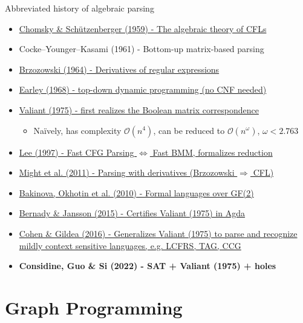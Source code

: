 \documentclass{beamer}
\begin{document}
\begin{frame}{Abbreviated history of algebraic parsing}
  \begin{itemize}
    \item \href{http://www-igm.univ-mlv.fr/~berstel/Mps/Travaux/A/1963-7ChomskyAlgebraic.pdf}{Chomsky \& Sch\"utzenberger (1959) - The algebraic theory of CFLs}
    \item Cocke–Younger–Kasami (1961) - Bottom-up matrix-based parsing
    \item \href{https://dl.acm.org/doi/10.1145/321239.321249}{Brzozowski (1964) - Derivatives of regular expressions}
    \item \href{https://dl.acm.org/doi/10.1145/362007.362035}{Earley (1968) - top-down dynamic programming (no CNF needed)}
    \item \href{http://theory.stanford.edu/~virgi/cs367/papers/valiantcfg.pdf}{Valiant (1975) - first realizes the Boolean matrix correspondence}
    \begin{itemize}
      \item Na\"ively, has complexity $\mathcal{O}(n^4)$, can be reduced to $\mathcal{O}(n^\omega)$, $\omega < 2.763$
    \end{itemize}
    \item \href{https://www.cs.cornell.edu/home/llee/papers/bmmcfl-jacm.pdf}{Lee (1997) - Fast CFG Parsing $\Longleftrightarrow$ Fast BMM, formalizes reduction}
    \item \href{https://matt.might.net/papers/might2011derivatives.pdf}{Might et al. (2011) - Parsing with derivatives (Brzozowski $\Rightarrow$ CFL)}
    \item \href{https://users.math-cs.spbu.ru/~okhotin/papers/formal_languages_gf2.pdf}{Bakinova, Okhotin et al. (2010) - Formal languages over GF(2)}
    \item \href{https://arxiv.org/pdf/1601.07724.pdf}{Bernady \& Jansson (2015) - Certifies Valiant (1975) in Agda}
    \item \href{https://arxiv.org/pdf/1504.08342.pdf}{Cohen \& Gildea (2016) - Generalizes Valiant (1975) to parse and recognize mildly context sensitive languages, e.g. LCFRS, TAG, CCG}
    \item \textbf{Considine, Guo \& Si (2022) - SAT + Valiant (1975) + holes}
  \end{itemize}
\end{frame}

\section{Graph Programming}
\end{document}
